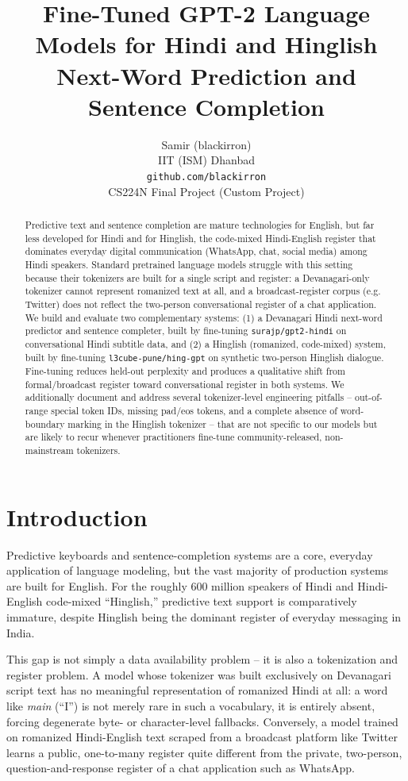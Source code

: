 \documentclass[11pt]{article}
\title{Fine-Tuned GPT-2 Language Models for Hindi and Hinglish \\ Next-Word Prediction and Sentence Completion}
\author{
Samir (blackirron) \\
IIT (ISM) Dhanbad \\
\texttt{github.com/blackirron} \\
CS224N Final Project (Custom Project)
}
\begin{document}
\maketitle

\begin{abstract}
Predictive text and sentence completion are mature technologies for English, but far less developed for Hindi and for Hinglish, the code-mixed Hindi-English register that dominates everyday digital communication (WhatsApp, chat, social media) among Hindi speakers. Standard pretrained language models struggle with this setting because their tokenizers are built for a single script and register: a Devanagari-only tokenizer cannot represent romanized text at all, and a broadcast-register corpus (e.g. Twitter) does not reflect the two-person conversational register of a chat application. We build and evaluate two complementary systems: (1) a Devanagari Hindi next-word predictor and sentence completer, built by fine-tuning \texttt{surajp/gpt2-hindi} on conversational Hindi subtitle data, and (2) a Hinglish (romanized, code-mixed) system, built by fine-tuning \texttt{l3cube-pune/hing-gpt} on synthetic two-person Hinglish dialogue. Fine-tuning reduces held-out perplexity and produces a qualitative shift from formal/broadcast register toward conversational register in both systems. We additionally document and address several tokenizer-level engineering pitfalls -- out-of-range special token IDs, missing pad/eos tokens, and a complete absence of word-boundary marking in the Hinglish tokenizer -- that are not specific to our models but are likely to recur whenever practitioners fine-tune community-released, non-mainstream tokenizers.
\end{abstract}

\section{Introduction}

Predictive keyboards and sentence-completion systems are a core, everyday application of language modeling, but the vast majority of production systems are built for English. For the roughly 600 million speakers of Hindi and Hindi-English code-mixed ``Hinglish,'' predictive text support is comparatively immature, despite Hinglish being the dominant register of everyday messaging in India.

This gap is not simply a data availability problem -- it is also a tokenization and register problem. A model whose tokenizer was built exclusively on Devanagari script text has no meaningful representation of romanized Hindi at all: a word like \textit{main} (``I'') is not merely rare in such a vocabulary, it is entirely absent, forcing degenerate byte- or character-level fallbacks. Conversely, a model trained on romanized Hindi-English text scraped from a broadcast platform like Twitter learns a public, one-to-many register quite different from the private, two-person, question-and-response register of a chat application such as WhatsApp.
\end{document}
